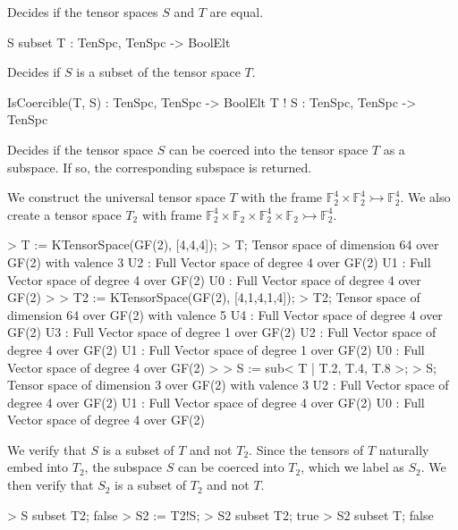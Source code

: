 Decides if the tensor spaces $S$ and $T$ are equal.

\begin{intrinsics}
S subset T : TenSpc, TenSpc -> BoolElt
\end{intrinsics}

Decides if $S$ is a subset of the tensor space $T$.

\begin{intrinsics}
IsCoercible(T, S) : TenSpc, TenSpc -> BoolElt
T ! S : TenSpc, TenSpc -> TenSpc
\end{intrinsics}

Decides if the tensor space $S$ can be coerced into the tensor space $T$ as a
subspace. If so, the corresponding subspace is returned. 

\begin{example}[TenSpcContainment]

We construct the universal tensor space $T$ with the frame $\mathbb{F}_2^4\times
\mathbb{F}_2^4\rightarrowtail \mathbb{F}_2^4$. We also create a tensor space
$T_2$ with frame $\mathbb{F}_2^4\times \mathbb{F}_2\times
\mathbb{F}_2^4\times\mathbb{F}_2\rightarrowtail \mathbb{F}_2^4$.

\begin{code}
> T := KTensorSpace(GF(2), [4,4,4]);
> T;
Tensor space of dimension 64 over GF(2) with valence 3
U2 : Full Vector space of degree 4 over GF(2)
U1 : Full Vector space of degree 4 over GF(2)
U0 : Full Vector space of degree 4 over GF(2)
> 
> T2 := KTensorSpace(GF(2), [4,1,4,1,4]);
> T2;
Tensor space of dimension 64 over GF(2) with valence 5
U4 : Full Vector space of degree 4 over GF(2)
U3 : Full Vector space of degree 1 over GF(2)
U2 : Full Vector space of degree 4 over GF(2)
U1 : Full Vector space of degree 1 over GF(2)
U0 : Full Vector space of degree 4 over GF(2)
> 
> S := sub< T | T.2, T.4, T.8 >;
> S;
Tensor space of dimension 3 over GF(2) with valence 3
U2 : Full Vector space of degree 4 over GF(2)
U1 : Full Vector space of degree 4 over GF(2)
U0 : Full Vector space of degree 4 over GF(2)
\end{code}

We verify that $S$ is a subset of $T$ and not $T_2$. Since the tensors of $T$
naturally embed into $T_2$, the subspace $S$ can be coerced into $T_2$, which we
label as $S_2$. We then verify that $S_2$ is a subset of $T_2$ and not $T$. 
\begin{code}
> S subset T2;
false
> S2 := T2!S;
> S2 subset T2;
true
> S2 subset T;
false
\end{code}
\end{example}


